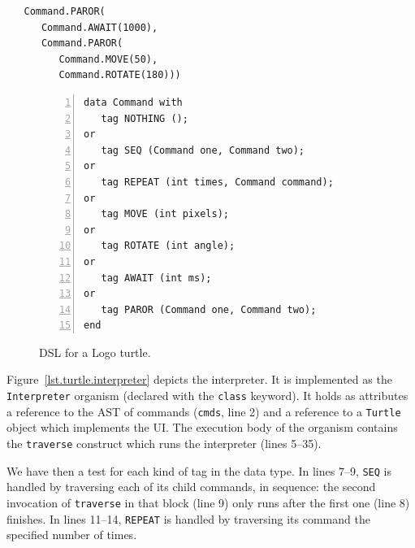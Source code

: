 \documentclass{sig-alternate}
\newcommand{\code}[1] {{\small{\texttt{#1}}}}
\begin{document}
\begin{verbatim}
   Command.PAROR(
      Command.AWAIT(1000),
      Command.PAROR(
         Command.MOVE(50),
         Command.ROTATE(180)))
\end{verbatim}

\begin{figure}%
\begin{lstlisting}[numbers=left,xleftmargin=3em]
data Command with
   tag NOTHING ();
or
   tag SEQ (Command one, Command two);
or
   tag REPEAT (int times, Command command);
or
   tag MOVE (int pixels);
or
   tag ROTATE (int angle);
or
   tag AWAIT (int ms);
or
   tag PAROR (Command one, Command two);
end
\end{lstlisting}
\caption{ DSL for a Logo turtle.
\label{lst.turtle.dsl}
}
\end{figure}

Figure~\ref{lst.turtle.interpreter} depicts the interpreter. It is implemented
as the \code{Interpreter} organism (declared with the \code{class} keyword).
It holds as attributes a reference to the AST of commands (\code{cmds}, line 2)
and a reference to a \code{Turtle} object which implements the UI. The
execution body of the organism contains the \code{traverse} construct which
runs the interpreter (lines 5--35).

We have then a test for each kind of tag in the data type. In lines 7--9,
\code{SEQ} is handled by traversing each of its child commands, in sequence:
the second invocation of \code{traverse} in that block (line 9) only runs
after the first one (line 8) finishes. In lines 11--14, \code{REPEAT} is
handled by traversing its command the specified number of times.
\end{document}
